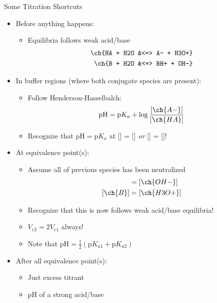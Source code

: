\documentclass[handout]{beamer}
\begin{document}
\begin{frame}[allowframebreaks]{Some Titration Shortcuts}
	\begin{itemize}
		\item Before anything happens:
			\begin{itemize}
				\item Equilibria follows weak acid/base
					\begin{align*}
						\ch{HA + H2O &<=> A- + H3O+} \\
						\ch{B + H2O &<=> BH+ + OH-}
					\end{align*}
			\end{itemize}
		\item In buffer regions (where both conjugate species are
			present):
			\begin{itemize}
				\item Follow Henderson-Hasselbalch:
					\begin{align*}
						\text{pH} = \text{p}K_a +
						\log\dfrac{[\ch{A-}]}{[\ch{HA}]}
					\end{align*}
				\item Recognize that $\text{pH} = \text{p}K_a$
					at [] = [] \textit{or}
					[] = []!
			\end{itemize}

			\framebreak

		\item At equivalence point(s):
			\begin{itemize}
				\item Assume all of previous species has been
					neutralized
					\begin{align*}
						[\ch{HA}] &= [\ch{OH-}] \\
						[\ch{B}] &= [\ch{H3O+}]
					\end{align*}
				\item Recognize that this is now follows
					\alert{weak acid/base equilibria}!
				\item $V_{e2} = 2V_{e1}$ \alert{always}!
				\item Note that $\text{pH} =
					\frac{1}{2}(\text{p}K_{a1} +
					\text{p}K_{a2})$
			\end{itemize}
		\item After all equivalence point(s):
			\begin{itemize}
				\item Just excess titrant
				\item pH of a strong acid/base
			\end{itemize}
	\end{itemize}
\end{frame}
\end{document}
